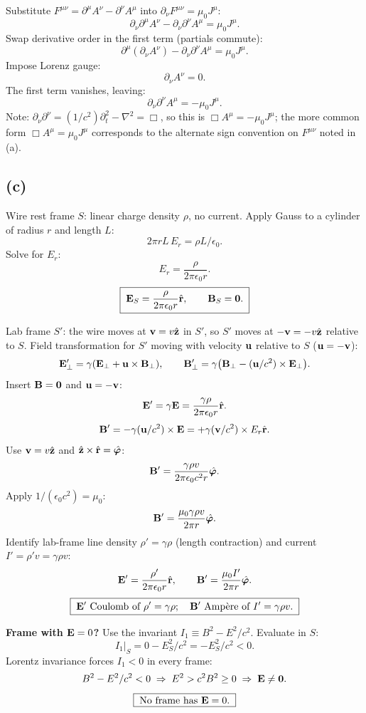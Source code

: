 \documentclass[11pt]{article}
\begin{document}
Substitute $F^{\mu\nu}=\partial^\mu A^\nu-\partial^\nu A^\mu$ into $\partial_\nu F^{\mu\nu}=\mu_0 J^\mu$:
\[ \partial_\nu\partial^\mu A^\nu - \partial_\nu\partial^\nu A^\mu = \mu_0 J^\mu. \]
Swap derivative order in the first term (partials commute):
\[ \partial^\mu(\partial_\nu A^\nu) - \partial_\nu\partial^\nu A^\mu = \mu_0 J^\mu. \]
Impose Lorenz gauge:
\[ \partial_\nu A^\nu = 0. \]
The first term vanishes, leaving:
\[ \boxed{\;\partial_\nu\partial^\nu A^\mu = -\mu_0 J^\mu.\;} \]
Note: $\partial_\nu\partial^\nu = (1/c^2)\partial_t^2 - \nabla^2 = \Box$, so this is $\Box A^\mu = -\mu_0 J^\mu$; the more common form $\Box A^\mu = \mu_0 J^\mu$ corresponds to the alternate sign convention on $F^{\mu\nu}$ noted in (a).

\subsection*{(c)}

Wire rest frame $S$: linear charge density $\rho$, no current. Apply Gauss to a cylinder of radius $r$ and length $L$:
\[ 2\pi r L\,E_r = \rho L/\epsilon_0. \]
Solve for $E_r$:
\[ E_r = \frac{\rho}{2\pi\epsilon_0 r}. \]
\[ \boxed{\;\vb E_S = \frac{\rho}{2\pi\epsilon_0 r}\hat{\vb r},\qquad \vb B_S = \bm 0.\;} \]

Lab frame $S'$: the wire moves at $\vb v = v\hat{\vb z}$ in $S'$, so $S'$ moves at $-\vb v = -v\hat{\vb z}$ relative to $S$. Field transformation for $S'$ moving with velocity $\vb u$ relative to $S$ ($\vb u=-\vb v$):
\[ \vb E'_\perp = \gamma(\vb E_\perp + \vb u\times\vb B_\perp),\qquad \vb B'_\perp = \gamma\bigl(\vb B_\perp - (\vb u/c^2)\times\vb E_\perp\bigr). \]
Insert $\vb B = \bm 0$ and $\vb u = -\vb v$:
\[ \vb E' = \gamma\vb E = \frac{\gamma\rho}{2\pi\epsilon_0 r}\hat{\vb r}. \]
\[ \vb B' = -\gamma(\vb u/c^2)\times\vb E = +\gamma(\vb v/c^2)\times E_r\hat{\vb r}. \]
Use $\vb v = v\hat{\vb z}$ and $\hat{\vb z}\times\hat{\vb r}=\hat{\bm\varphi}$:
\[ \vb B' = \frac{\gamma\rho v}{2\pi\epsilon_0 c^2 r}\hat{\bm\varphi}. \]
Apply $1/(\epsilon_0 c^2) = \mu_0$:
\[ \vb B' = \frac{\mu_0\gamma\rho v}{2\pi r}\hat{\bm\varphi}. \]
Identify lab-frame line density $\rho'=\gamma\rho$ (length contraction) and current $I'=\rho' v=\gamma\rho v$:
\[ \vb E' = \frac{\rho'}{2\pi\epsilon_0 r}\hat{\vb r},\qquad \vb B' = \frac{\mu_0 I'}{2\pi r}\hat{\bm\varphi}. \]
\[ \boxed{\;\vb E' \text{ Coulomb of } \rho'=\gamma\rho;\quad \vb B' \text{ Amp\`ere of } I' = \gamma\rho v.\;} \]

\textbf{Frame with $\vb E=0$?} Use the invariant $I_1 \equiv B^2 - E^2/c^2$. Evaluate in $S$:
\[ I_1\big|_S = 0 - E_S^2/c^2 = -E_S^2/c^2 < 0. \]
Lorentz invariance forces $I_1<0$ in every frame:
\[ B^2 - E^2/c^2 < 0 \;\Rightarrow\; E^2 > c^2 B^2 \ge 0\;\Rightarrow\; \vb E\ne\bm 0. \]
\[ \boxed{\;\text{No frame has }\vb E=0.\;} \]
\end{document}
